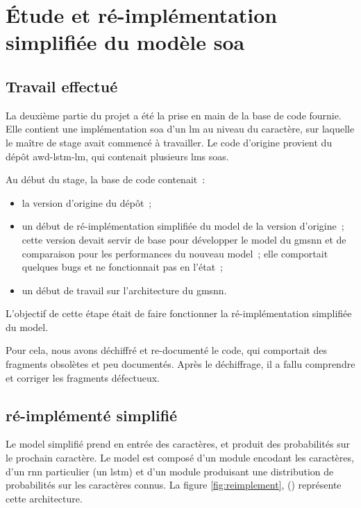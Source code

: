 \section{Étude et ré-implémentation simplifiée du modèle \gls{soa}}
\subsection{Travail effectué}\label{subsec:codebase}
La deuxième partie du projet a été la prise en main de la base de code fournie.
Elle contient une implémentation \gls{soa} d'un \gls{lm} au niveau du caractère, sur laquelle le maître de stage avait commencé à travailler.
Le code d'origine provient du dépôt \og awd-lstm-lm\fg{}\autocite{awd_source}, qui contenait plusieurs \glspl{lm} \glspl{soa}.

Au début du stage, la base de code contenait~:
\begin{itemize}
	\item la version d'origine du dépôt~;
	\item un début de ré-implémentation simplifiée du \gls{model} de la version d'origine~; cette version  devait servir de base pour développer le \gls{model} du \gls{gmsnn} et de comparaison pour les performances du nouveau \gls{model}~; elle comportait quelques \glspl{bug} et ne fonctionnait pas en l'état~;
	\item un début de travail sur l'architecture du \gls{gmsnn}.
\end{itemize}

\vspace{1em}
L'objectif de cette étape était de faire fonctionner la ré-implémentation simplifiée du \gls{model}.

Pour cela, nous avons déchiffré et re-documenté le code, qui comportait des fragments obsolètes et peu documentés.
Après le déchiffrage, il a fallu comprendre et corriger les fragments défectueux.

\pagebreak
\subsection[\Glsentrytext{model} ré-implémenté simplifié]{ ré-implémenté simplifié} 
Le \gls{model} simplifié prend en entrée des caractères, et produit des probabilités sur le prochain caractère.
Le \gls{model} est composé d'un module encodant les caractères, d'un \gls{rnn} particulier (un \gls{lstm}) et d'un module produisant une distribution de probabilités sur les caractères connus. La figure \ref{fig:reimplement}, () représente cette architecture.

